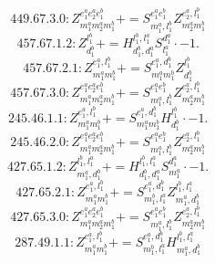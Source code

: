 \documentclass[letterpaper,10pt,fleqn,leqno,onecolumn]{article}
\begin{document}
\begin{equation} \;\;\;\;\;\;  449.67.3.0: Z^{e_{1}^{a}e_{2}^{a}e_{1}^{b}}_{m_{1}^{a}m_{2}^{a}m_{1}^{b}}+=S^{e_{1}^{a}e_{1}^{b}}_{m_{1}^{a},l_{1}^{b}}Z^{e_{2}^{a},l_{1}^{b}}_{m_{2}^{a}m_{1}^{b}} \end{equation}
\begin{equation} \;\;\;\;\;\;  457.67.1.2: Z^{l_{1}^{b}}_{d_{1}^{b}}+=H^{l_{1}^{b},l_{1}^{a}}_{d_{1}^{b},d_{1}^{a}}S^{d_{1}^{a}}_{l_{1}^{a}}\cdot -1. \end{equation}
\begin{equation} \;\;\;\;\;\;  457.67.2.1: Z^{e_{1}^{a},l_{1}^{b}}_{m_{1}^{a}m_{1}^{b}}+=S^{e_{1}^{a},d_{1}^{b}}_{m_{1}^{a}m_{1}^{b}}Z^{l_{1}^{b}}_{d_{1}^{b}} \end{equation}
\begin{equation} \;\;\;\;\;\;  457.67.3.0: Z^{e_{1}^{a}e_{2}^{a}e_{1}^{b}}_{m_{1}^{a}m_{2}^{a}m_{1}^{b}}+=S^{e_{1}^{a}e_{1}^{b}}_{m_{1}^{a},l_{1}^{b}}Z^{e_{2}^{a},l_{1}^{b}}_{m_{2}^{a}m_{1}^{b}} \end{equation}
\begin{equation} \;\;\;\;\;\;  245.46.1.1: Z^{e_{1}^{a},l_{1}^{b}}_{m_{1}^{a}m_{1}^{b}}+=S^{e_{1}^{a},d_{1}^{b}}_{m_{1}^{a}m_{1}^{b}}H^{l_{1}^{b}}_{d_{1}^{b}}\cdot -1. \end{equation}
\begin{equation} \;\;\;\;\;\;  245.46.2.0: Z^{e_{1}^{a}e_{2}^{a}e_{1}^{b}}_{m_{1}^{a}m_{2}^{a}m_{1}^{b}}+=S^{e_{1}^{a}e_{1}^{b}}_{m_{1}^{a},l_{1}^{b}}Z^{e_{2}^{a},l_{1}^{b}}_{m_{2}^{a}m_{1}^{b}} \end{equation}
\begin{equation} \;\;\;\;\;\;  427.65.1.2: Z^{l_{1}^{b},l_{1}^{a}}_{m_{1}^{a},d_{1}^{b}}+=H^{l_{1}^{b},l_{1}^{a}}_{d_{1}^{b},d_{1}^{a}}S^{d_{1}^{a}}_{m_{1}^{a}}\cdot -1. \end{equation}
\begin{equation} \;\;\;\;\;\;  427.65.2.1: Z^{e_{1}^{a},l_{1}^{b}}_{m_{1}^{a}m_{1}^{b}}+=S^{e_{1}^{a},d_{1}^{b}}_{m_{1}^{b},l_{1}^{a}}Z^{l_{1}^{b},l_{1}^{a}}_{m_{1}^{a},d_{1}^{b}} \end{equation}
\begin{equation} \;\;\;\;\;\;  427.65.3.0: Z^{e_{1}^{a}e_{2}^{a}e_{1}^{b}}_{m_{1}^{a}m_{2}^{a}m_{1}^{b}}+=S^{e_{1}^{a}e_{1}^{b}}_{m_{1}^{a},l_{1}^{b}}Z^{e_{2}^{a},l_{1}^{b}}_{m_{2}^{a}m_{1}^{b}} \end{equation}
\begin{equation} \;\;\;\;\;\;  287.49.1.1: Z^{e_{1}^{a},l_{1}^{b}}_{m_{1}^{a}m_{1}^{b}}+=S^{e_{1}^{a},d_{1}^{b}}_{m_{1}^{b},l_{1}^{a}}H^{l_{1}^{b},l_{1}^{a}}_{m_{1}^{a},d_{1}^{b}} \end{equation}
\end{document}
